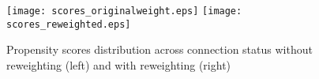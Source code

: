 \begin{figure}[htbp]
    \centering
    \texttt{[image: scores\_originalweight.eps]}
    \texttt{[image: scores\_reweighted.eps]}   
    \caption{Propensity scores distribution across connection status without reweighting (left) and with reweighting (right)}
    \label{fig:scores_density}
\end{figure}